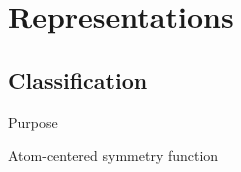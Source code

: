 
\section{Representations}
\subsection{Classification}
\begin{frame}{Purpose}

\end{frame}




% 
% 
\begin{frame}{Atom-centered symmetry function}
%
\end{frame}

